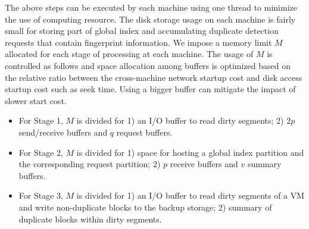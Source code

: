 The above steps can be executed by each machine using one thread to minimize the use of computing resource.
The  disk storage usage on each machine 
is fairly small for  storing part of global index and
accumulating  duplicate detection requests that contain fingerprint information.   
We impose a memory limit $M$ allocated for each stage of processing at each machine.
The usage of $M$ is controlled as follows and space allocation among buffers is optimized based on the relative
ratio between the cross-machine network  startup cost and disk access startup cost such as seek time.
Using a bigger buffer  can mitigate the impact of slower start cost. 
\begin{itemize}
\item For Stage 1, $M$  is divided for 
1) an I/O buffer to read dirty segments; 2) $2p$ send/receive buffers and $q$ request  buffers.

\item 
For Stage 2,  $M$  is divided for 1) space for hosting a global index partition and 
the corresponding request partition; 2) $p$ receive buffers and $v$ summary buffers.

\item For Stage 3, $M$  is divided for 1) an I/O buffer to read dirty segments of a VM and   
write non-duplicate blocks to the  backup storage;
2) summary of duplicate blocks within dirty segments. 
\end{itemize}

